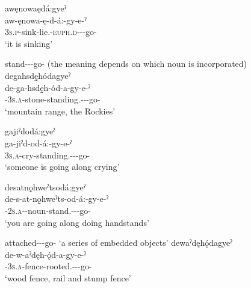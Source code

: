 \ex awęnowaędá:gyeˀ\\
\gll aw-ęnowa-ę-d-á:-gy-e-ˀ\\
 \textsc{3s.p}-sink-lie.{\stative}-\textsc{euph.d-\joinerA}-{\progressive}-go-{\stative}\\
\glt `it is sinking'

\z
\z

\ea\label{ex:purpprogsufex4}  stand-{\joinerA}-{\progressive}-go-{\stative} (the meaning depends on which noun is incorporated)
\ea degahsdę̱hódagyeˀ\\
\gll de-ga-hsdę̱h-ód-a-gy-e-ˀ\\
 {\dualic}-\textsc{3s.a}-stone-standing.{\stative}-\joinerA-{\progressive}-go-{\stative}\\
\glt `mountain range, the Rockies'

\ex gajiˀdodá:gyeˀ\\
\gll ga-jiˀd-od-á:-gy-e-ˀ\\
 \textsc{3s.a}-cry-standing.{\stative}-\joinerA-{\progressive}-go-{\stative}\\
\glt `someone is going along crying'


\ex desatnǫ̱hweˀtsodá:gyeˀ\\
\gll de-s-at-nǫ̱hweˀts-od-á:-gy-e-ˀ\\
 {\dualic}-\textsc{2s.a}-{\semireflexive}-noun-stand.{\stative}-\joinerA-{\progressive}-go-{\stative}\\
\glt `you are going along doing handstands'

\z
\z

\ea\label{ex:purpprogsufex5}  attached-{\joinerA}-{\progressive}-go-{\stative} ‘a series of embedded objects’
\ea dewaˀdęhǫ́dagyeˀ\\
\gll de-w-aˀdęh-ǫ́d-a-gy-e-ˀ\\
 {\dualic}-\textsc{3s.a}-fence-rooted.{\stative}-{\joinerA-\progressive}-go-{\stative}\\
\glt `wood fence, rail and stump fence'

